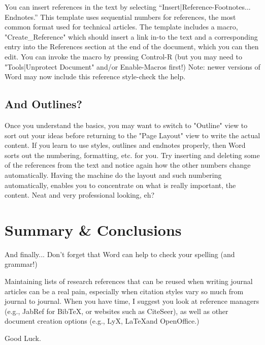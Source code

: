 \documentclass[a4paper, 12pt]{article}
\begin{document}
    You can insert references in the text by selecting “Insert|Reference-Footnotes... Endnotes.” 
    This template uses sequential numbers for references, the most common format used for 
    technical articles. The template includes a macro, "Create\_Reference" which should insert 
    a link in-to the text and a corresponding entry into the References section at the end of 
    the document, which you can then edit. You can invoke the macro by pressing Control-R 
    (but you may need to "Tools|Unprotect Document" and/or Enable-Macros first!) 
    Note: newer versions of Word may now include this reference style-check the help.
    
    \subsection{And Outlines?}
    
    Once you understand the basics, you may want to switch to "Outline" view to sort out your ideas 
    before returning to the "Page Layout" view to write the actual content. If you learn to use styles, 
    outlines and endnotes properly, then Word sorts out the numbering, formatting, etc. for you. 
    Try inserting and deleting some of the references from the text and notice again how the other 
    numbers change automatically. Having the machine do the layout and such numbering automatically, 
    enables you to concentrate on what is really important, the content. 
    Neat and very professional looking, eh?
    
    
    \section{Summary \& Conclusions}
    
    And finally... Don’t forget that Word can help to check your spelling (and grammar!)
    
    Maintaining lists of research references that can be reused when writing journal articles 
    can be a real pain, especially when citation styles vary so much from journal to journal. 
    When you have time, I suggest you look at reference managers 
    (e.g., JabRef for BibTeX, or websites such as CiteSeer), as well as other document creation 
    options (e.g., LyX, \LaTeX and OpenOffice.)
    
    Good Luck.
    
    
    
    \printbibliography
    
    
        
\end{document}
